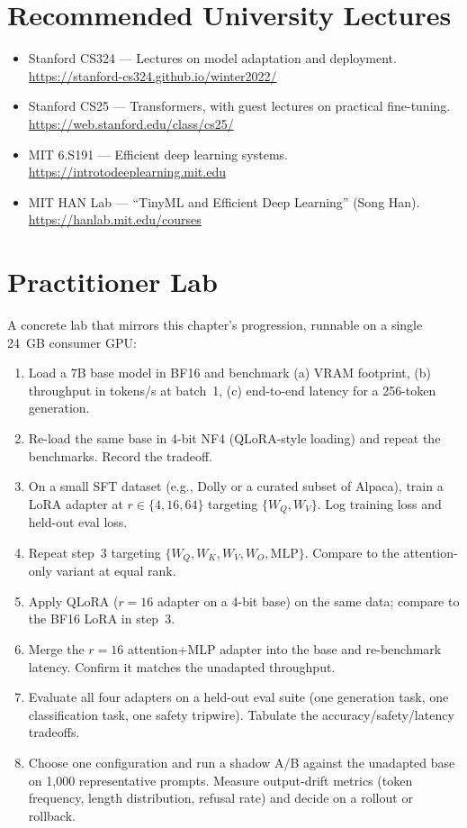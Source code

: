 \section{Recommended University Lectures}

\begin{itemize}
  \item Stanford CS324 --- Lectures on model adaptation and
        deployment.  \url{https://stanford-cs324.github.io/winter2022/}
  \item Stanford CS25 --- Transformers, with guest lectures on
        practical fine-tuning.  \url{https://web.stanford.edu/class/cs25/}
  \item MIT 6.S191 --- Efficient deep learning systems.
        \url{https://introtodeeplearning.mit.edu}
  \item MIT HAN Lab --- ``TinyML and Efficient Deep Learning''
        (Song Han).  \url{https://hanlab.mit.edu/courses}
\end{itemize}

\section{Practitioner Lab}

A concrete lab that mirrors this chapter's progression, runnable on
a single 24~GB consumer GPU:

\begin{enumerate}
  \item Load a 7B base model in BF16 and benchmark (a) VRAM
        footprint, (b) throughput in tokens/s at batch~1, (c)
        end-to-end latency for a 256-token generation.
  \item Re-load the same base in 4-bit NF4 (QLoRA-style loading)
        and repeat the benchmarks. Record the tradeoff.
  \item On a small SFT dataset (e.g., Dolly or a curated subset of
        Alpaca), train a LoRA adapter at $r\in\{4, 16, 64\}$
        targeting $\{W_Q, W_V\}$. Log training loss and held-out
        eval loss.
  \item Repeat step~3 targeting $\{W_Q, W_K, W_V, W_O, \text{MLP}\}$.
        Compare to the attention-only variant at equal rank.
  \item Apply QLoRA ($r=16$ adapter on a 4-bit base) on the same
        data; compare to the BF16 LoRA in step~3.
  \item Merge the $r=16$ attention+MLP adapter into the base and
        re-benchmark latency. Confirm it matches the unadapted
        throughput.
  \item Evaluate all four adapters on a held-out eval suite (one
        generation task, one classification task, one safety
        tripwire). Tabulate the accuracy/safety/latency tradeoffs.
  \item Choose one configuration and run a shadow A/B against the
        unadapted base on 1,000 representative prompts. Measure
        output-drift metrics (token frequency, length distribution,
        refusal rate) and decide on a rollout or rollback.
\end{enumerate}

